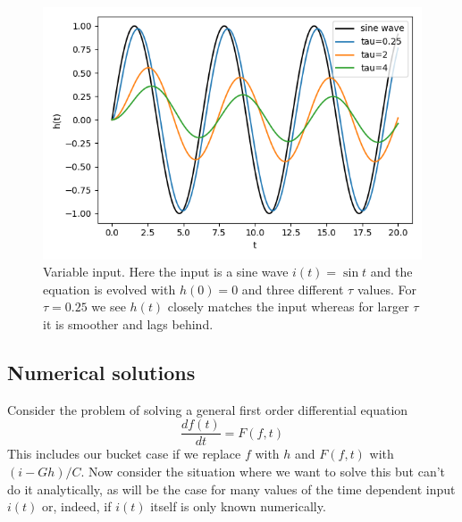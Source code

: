 \documentclass[11pt,a4paper]{scrartcl}
\begin{document}
\begin{figure}
\begin{center}
\includegraphics{chasing.png}
\end{center}
\caption{Variable input. Here the input is a sine wave $i(t)=\sin{t}$
  and the equation is evolved with $h(0)=0$ and three different $\tau$
  values. For $\tau=0.25$ we see $h(t)$ closely matches the input
  whereas for larger $\tau$ it is smoother and lags
  behind.\label{chasing}}
\end{figure}


\subsection*{Numerical solutions}

Consider the problem of solving a general first order differential equation
\begin{equation}
\frac{df(t)}{dt}=F(f,t)
\end{equation}
This includes our bucket case if we replace $f$ with $h$ and $F(f,t)$
with $(i-Gh)/C$. Now consider the situation where we want to solve
this but can't do it analytically, as will be the case for many
values of the time dependent input $i(t)$ or, indeed, if $i(t)$ itself
is only known numerically. 
\end{document}

